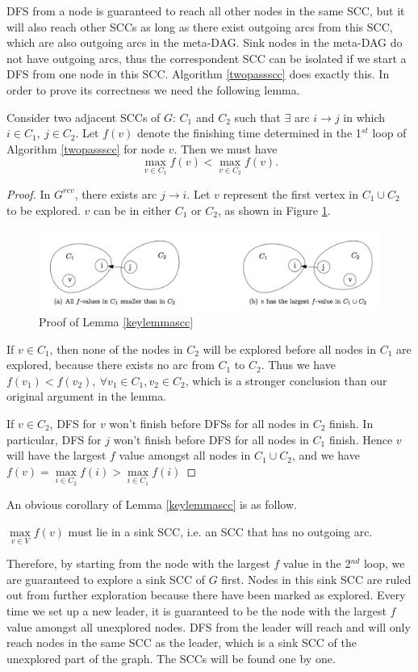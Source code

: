 DFS from a node is guaranteed to reach all other nodes in the same SCC, but it will also reach other SCCs as long as there exist outgoing arcs from this SCC, which are also outgoing arcs in the meta-DAG. Sink nodes in the meta-DAG do not have outgoing arcs, thus the correspondent SCC can be isolated if we start a DFS from one node in this SCC. Algorithm \ref{twopassscc} does exactly this. In order to prove its correctness we need the following lemma.
\begin{lemma}\label{keylemmascc}
Consider two adjacent SCCs of $G$: $C_1$ and $C_2$ such that $\exists$ arc $i\rightarrow j$ in which $i\in C_1,\:j\in C_2$. Let $f(v)$ denote the finishing time determined in the 1$^{st}$ loop of Algorithm \ref{twopassscc} for node $v$. Then we must have
$$\max\limits_{v\in C_1}f(v)<\max\limits_{v\in C_2}f(v).$$
\end{lemma}
\begin{proof}
In $G^{rev}$, there exists arc $j\rightarrow i$. Let $v$ represent the first vertex in $C_1\cup C_2$ to be explored. $v$ can be in either $C_1$ or $C_2$, as shown in Figure \ref{prooflemmascc}.
\begin{figure}[ht]
\centering
\includegraphics[width=\textwidth]{prooflemmascc.jpg}
\caption{Proof of Lemma \ref{keylemmascc}}\label{prooflemmascc}
\end{figure}

If $v\in C_1$, then none of the nodes in $C_2$ will be explored before all nodes in $C_1$ are explored, because there exists no arc from $C_1$ to $C_2$. Thus we have $f(v_1)<f(v_2),\:\forall v_1\in C_1, v_2\in C_2$, which is a stronger conclusion than our original argument in the lemma.

If $v\in C_2$, DFS for $v$ won't finish before DFSs for all nodes in $C_2$ finish. In particular, DFS for $j$ won't finish before DFS for all nodes in $C_1$ finish. Hence $v$ will have the largest $f$ value amongst all nodes in $C_1\cup C_2$, and we have $f(v)=\max\limits_{i\in C_2}f(i)>\max\limits_{i\in C_1}f(i)$ 
\end{proof}

An obvious corollary of Lemma \ref{keylemmascc} is as follow.
\begin{corollary}\label{corollaryscc}
$\max\limits_{v\in V}f(v)$ must lie in a sink SCC, i.e. an SCC that has no outgoing arc. 
\end{corollary}
Therefore, by starting from the node with the largest $f$ value in the 2$^{nd}$ loop, we are guaranteed to explore a sink SCC of $G$ first. Nodes in this sink SCC are ruled out from further exploration because there have been marked as explored. Every time we set up a new leader, it is guaranteed to be the node with the largest $f$ value amongst all unexplored nodes. DFS from the leader will reach and will only reach nodes in the same SCC as the leader, which is a sink SCC of the unexplored part of the graph. The SCCs will be found one by one.
